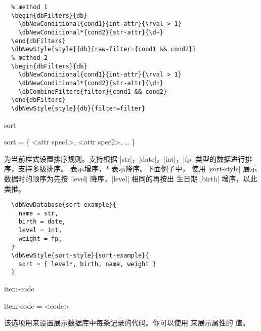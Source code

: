 \documentclass[full]{l3doc}
\begin{document}
\begin{documentation}

\begin{verbatim}
  % method 1
  \begin{dbFilters}{db}
    \dbNewConditional{cond1}{int-attr}{\rval > 1}
    \dbNewConditional*{cond2}{str-attr}{\d+}
  \end{dbFilters}
  \dbNewStyle{style}{db}{raw-filter={cond1 && cond2}}
  % method 2
  \begin{dbFilters}{db}
    \dbNewConditional{cond1}{int-attr}{\rval > 1}
    \dbNewConditional*{cond2}{str-attr}{\d+}
    \dbCombineFilters{filter}{cond1 && cond2}
  \end{dbFilters}
  \dbNewStyle{style}{db}{filter=filter}
\end{verbatim}

\begin{option}[added=2022-01-05]{sort}
  \begin{syntax}
    sort = \{ <attr spec1>, <attr spec2>, \ldots{} \}
  \end{syntax}

  为当前样式设置排序规则。支持根据 |str|，|date|，|int|，|fp| 类型的数据进行排
  序，支持多级排序。 表示增序，* 表示降序。下面例子中，
  使用 |sort-style| 展示数据时的顺序为先按 |level| 降序，|level| 相同的再按出
  生日期 |birth| 增序，以此类推。
\end{option}

\begin{verbatim}
  \dbNewDatabase{sort-example}{
    name = str,
    birth = date,
    level = int,
    weight = fp,
  }
  \dbNewStyle{sort-style}{sort-example}{
    sort = { level*, birth, name, weight }
  }
\end{verbatim}

\begin{option}[added=2022-01-05, rEXP]{item-code}
  \begin{syntax}
    item-code = <code>
  \end{syntax}

  该选项用来设置展示数据库中每条记录的代码。你可以使用  来展示属性的
  值。
\end{option}


\end{documentation}
\end{document}
